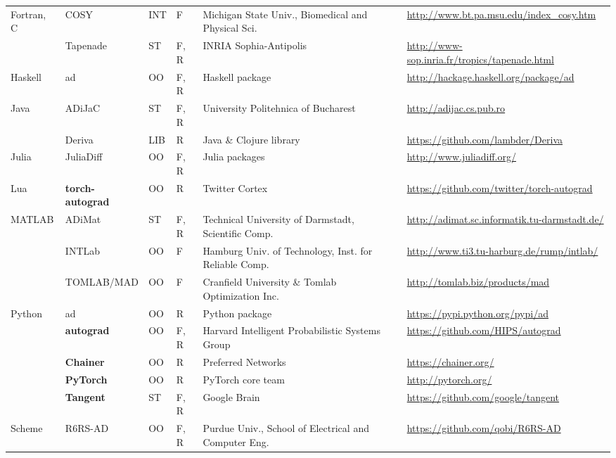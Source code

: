 \documentclass[twoside,11pt]{article}
\begin{document}
\begin{table}
{\begin{tabularx}{\textwidth}{@{}p{12mm}p{20mm}p{5mm}p{6mm}p{62mm}p{38mm}p{65mm}@{}}
    Fortran, C & COSY & INT & F & Michigan State Univ., Biomedical and Physical Sci. & \citet{Berz1996} & \tiny\url{http://www.bt.pa.msu.edu/index_cosy.htm}\\
    & Tapenade & ST & F, R & INRIA Sophia-Antipolis & \citet{Hascoet2013} & \tiny\url{http://www-sop.inria.fr/tropics/tapenade.html}\\
    Haskell & ad & OO & F, R & Haskell package & & \tiny\url{http://hackage.haskell.org/package/ad}\\
    Java & ADiJaC & ST & F, R & University Politehnica of Bucharest & \citet{slusanschi2016adijac} & \tiny\url{http://adijac.cs.pub.ro}\\
    & Deriva & LIB & R & Java \& Clojure library & & \tiny\url{https://github.com/lambder/Deriva}\\
    Julia & JuliaDiff & OO & F, R & Julia packages & \citet{RevelsLubinPapamarkou2016} & \tiny\url{http://www.juliadiff.org/}\\
    Lua & \textbf{torch-autograd} & OO & R & Twitter Cortex & & \tiny\url{https://github.com/twitter/torch-autograd}\\
    MATLAB & ADiMat & ST & F, R & Technical University of Darmstadt, Scientific Comp. & \citet{Willkomm2013} & \tiny\url{http://adimat.sc.informatik.tu-darmstadt.de/}\\
    & INTLab & OO & F & Hamburg Univ. of Technology, Inst. for Reliable Comp. & \citet{Rump1999} & \tiny\url{http://www.ti3.tu-harburg.de/rump/intlab/}\\
    & TOMLAB/MAD & OO & F & Cranfield University \& Tomlab Optimization Inc. & \citet{Forth2006} & \tiny\url{http://tomlab.biz/products/mad}\\
    Python & ad & OO & R & Python package & & \tiny\url{https://pypi.python.org/pypi/ad}\\
    & \textbf{autograd} & OO & F, R & Harvard Intelligent Probabilistic Systems Group & \citet{maclaurin2016modeling} & \tiny\url{https://github.com/HIPS/autograd}\\
    & \textbf{Chainer} & OO & R & Preferred Networks & \citet{tokui2015chainer} & \tiny\url{https://chainer.org/}\\
    & \textbf{PyTorch} & OO & R & PyTorch core team & \citet{paszke2017automatic} & \tiny\url{http://pytorch.org/}\\
    & \textbf{Tangent} & ST & F, R & Google Brain & \citet{van2017tangent} & \tiny\url{https://github.com/google/tangent}\\
    Scheme & R6RS-AD & OO & F, R & Purdue Univ., School of Electrical and Computer Eng. & & \tiny\url{https://github.com/qobi/R6RS-AD}\\

\end{tabularx}}
\end{table}
\end{document}
